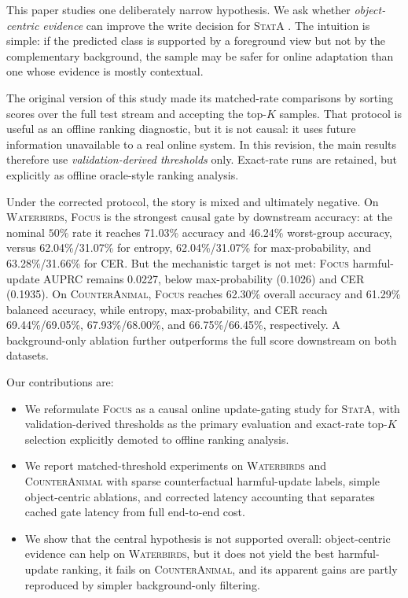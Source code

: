 \documentclass{article}
\newcommand{\focus}{\textsc{Focus}}
\newcommand{\stata}{\textsc{StatA}}
\newcommand{\wb}{\textsc{Waterbirds}}
\newcommand{\ca}{\textsc{CounterAnimal}}
\begin{document}
This paper studies one deliberately narrow hypothesis. We ask whether \emph{object-centric evidence} can improve the write decision for \stata{} \citep{zanella2025realistic}. The intuition is simple: if the predicted class is supported by a foreground view but not by the complementary background, the sample may be safer for online adaptation than one whose evidence is mostly contextual.

The original version of this study made its matched-rate comparisons by sorting scores over the full test stream and accepting the top-$K$ samples. That protocol is useful as an offline ranking diagnostic, but it is not causal: it uses future information unavailable to a real online system. In this revision, the main results therefore use \emph{validation-derived thresholds} only. Exact-rate runs are retained, but explicitly as offline oracle-style ranking analysis.

Under the corrected protocol, the story is mixed and ultimately negative. On \wb{}, \focus{} is the strongest causal gate by downstream accuracy: at the nominal $50\%$ rate it reaches 71.03\% accuracy and 46.24\% worst-group accuracy, versus 62.04\%/31.07\% for entropy, 62.04\%/31.07\% for max-probability, and 63.28\%/31.66\% for CER. But the mechanistic target is not met: \focus{} harmful-update AUPRC remains 0.0227, below max-probability (0.1026) and CER (0.1935). On \ca{}, \focus{} reaches 62.30\% overall accuracy and 61.29\% balanced accuracy, while entropy, max-probability, and CER reach 69.44\%/69.05\%, 67.93\%/68.00\%, and 66.75\%/66.45\%, respectively. A background-only ablation further outperforms the full score downstream on both datasets.

Our contributions are:
\begin{itemize}
    \item We reformulate \focus{} as a causal online update-gating study for \stata{}, with validation-derived thresholds as the primary evaluation and exact-rate top-$K$ selection explicitly demoted to offline ranking analysis.
    \item We report matched-threshold experiments on \wb{} and \ca{} with sparse counterfactual harmful-update labels, simple object-centric ablations, and corrected latency accounting that separates cached gate latency from full end-to-end cost.
    \item We show that the central hypothesis is not supported overall: object-centric evidence can help on \wb{}, but it does not yield the best harmful-update ranking, it fails on \ca{}, and its apparent gains are partly reproduced by simpler background-only filtering.
\end{itemize}
\end{document}
